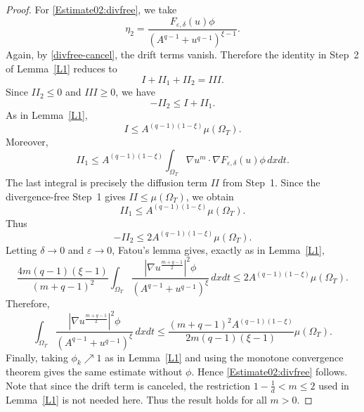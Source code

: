 \documentclass{amsart}
\numberwithin{equation}{section}
\begin{document}
\begin{proof}
For \eqref{Estimate02:divfree}, we take
\[
\eta_2
=
\frac{F_{\varepsilon,\delta}(u)\phi}
{\left(A^{q-1}+u^{q-1}\right)^{\xi-1}}.
\]
Again, by \eqref{divfree-cancel}, the drift terms vanish. Therefore the
identity in Step~2 of Lemma~\ref{L1} reduces to
\[
I+II_1+II_2=III.
\]
Since $II_2\le0$ and $III\ge0$, we have
\[
-II_2\le I+II_1.
\]
As in Lemma~\ref{L1},
\[
I\le A^{(q-1)(1-\xi)}\mu(\Omega_T).
\]
Moreover,
\[
II_1
\le
A^{(q-1)(1-\xi)}
\int_{\Omega_T}\nabla u^m\cdot\nabla F_{\varepsilon,\delta}(u)\phi\,dxdt.
\]
The last integral is precisely the diffusion term $II$ from Step~1. Since
the divergence-free Step~1 gives $II\le\mu(\Omega_T)$, we obtain
\[
II_1\le A^{(q-1)(1-\xi)}\mu(\Omega_T).
\]
Thus
\[
-II_2\le2A^{(q-1)(1-\xi)}\mu(\Omega_T).
\]
Letting $\delta\to0$ and $\varepsilon\to0$, Fatou's lemma gives, exactly as
in Lemma~\ref{L1},
\[
\frac{4m(q-1)(\xi-1)}
{(m+q-1)^2}
\int_{\Omega_T}
\frac{\left|\nabla u^{\frac{m+q-1}{2}}\right|^2\phi}
{\left(A^{q-1}+u^{q-1}\right)^\xi}
\,dxdt
\le
2A^{(q-1)(1-\xi)}\mu(\Omega_T).
\]
Therefore,
\[
\int_{\Omega_T}
\frac{\left|\nabla u^{\frac{m+q-1}{2}}\right|^2\phi}
{\left(A^{q-1}+u^{q-1}\right)^\xi}
\,dxdt
\le
\frac{(m+q-1)^2A^{(q-1)(1-\xi)}}
{2m(q-1)(\xi-1)}
\mu(\Omega_T).
\]
Finally, taking $\phi_k\nearrow1$ as in Lemma~\ref{L1} and using the
monotone convergence theorem gives the same estimate without $\phi$. Hence \eqref{Estimate02:divfree} follows. Note that since the drift term is canceled, the restriction $1-\frac{1}{d}<m\le2$ used in
Lemma~\ref{L1} is not needed here. Thus the result holds for all $m>0$.
\end{proof}
\end{document}
